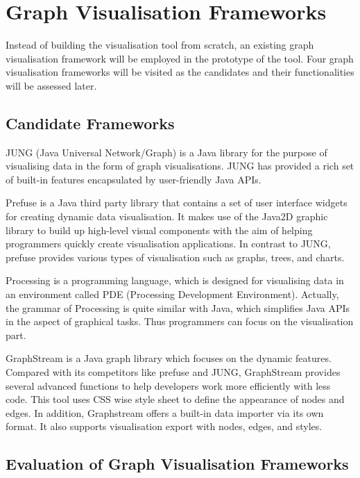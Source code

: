 \section{Graph Visualisation Frameworks}

Instead of building the visualisation tool from scratch, an existing graph visualisation framework will be employed in the prototype of the tool. Four graph visualisation frameworks will be visited as the candidates and their functionalities will be assessed later.

\subsection{Candidate Frameworks} \label{sec:candidate_framework}

JUNG (Java Universal Network/Graph) \citep{White2005} is a Java library for the purpose of visualising data in the form of graph visualisations. JUNG has provided a rich set of built-in features encapsulated by user-friendly Java APIs.

Prefuse \citep{Heer2005} is a Java third party library that contains a set of user interface widgets for creating dynamic data visualisation. It makes use of the Java2D graphic library to build up high-level visual components with the aim of helping programmers quickly create visualisation applications. In contrast to JUNG, prefuse provides various types of visualisation such as graphs, trees, and charts.

Processing \citep{Fry2008} is a programming language, which is designed for visualising data in an environment called PDE (Processing Development Environment). Actually, the grammar of Processing is quite similar with Java, which simplifies Java APIs in the aspect of graphical tasks. Thus programmers can focus on the visualisation part.

GraphStream \citep{Dutot2007} is a Java graph library which focuses on the dynamic features. Compared with its competitors like prefuse and JUNG, GraphStream provides several advanced functions to help developers work more efficiently with less code. This tool uses CSS wise style sheet to define the appearance of nodes and edges. In addition, Graphstream offers a built-in data importer via its own format. It also supports visualisation export with nodes, edges, and styles.

\subsection{Evaluation of Graph Visualisation Frameworks} \label{sec:evaluation_vis_framework}


